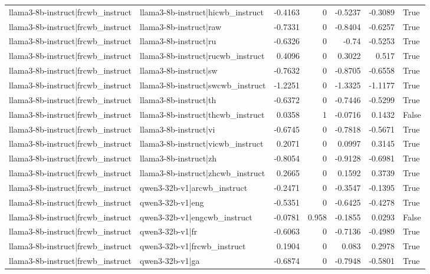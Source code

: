 \begin{table}
\begin{tabular}{l l r r r r l}
llama3-8b-instruct|frcwb_instruct & llama3-8b-instruct|hicwb_instruct & -0.4163 & 0 & -0.5237 & -0.3089 & True \\
llama3-8b-instruct|frcwb_instruct & llama3-8b-instruct|raw & -0.7331 & 0 & -0.8404 & -0.6257 & True \\
llama3-8b-instruct|frcwb_instruct & llama3-8b-instruct|ru & -0.6326 & 0 & -0.74 & -0.5253 & True \\
llama3-8b-instruct|frcwb_instruct & llama3-8b-instruct|rucwb_instruct & 0.4096 & 0 & 0.3022 & 0.517 & True \\
llama3-8b-instruct|frcwb_instruct & llama3-8b-instruct|sw & -0.7632 & 0 & -0.8705 & -0.6558 & True \\
llama3-8b-instruct|frcwb_instruct & llama3-8b-instruct|swcwb_instruct & -1.2251 & 0 & -1.3325 & -1.1177 & True \\
llama3-8b-instruct|frcwb_instruct & llama3-8b-instruct|th & -0.6372 & 0 & -0.7446 & -0.5299 & True \\
llama3-8b-instruct|frcwb_instruct & llama3-8b-instruct|thcwb_instruct & 0.0358 & 1 & -0.0716 & 0.1432 & False \\
llama3-8b-instruct|frcwb_instruct & llama3-8b-instruct|vi & -0.6745 & 0 & -0.7818 & -0.5671 & True \\
llama3-8b-instruct|frcwb_instruct & llama3-8b-instruct|vicwb_instruct & 0.2071 & 0 & 0.0997 & 0.3145 & True \\
llama3-8b-instruct|frcwb_instruct & llama3-8b-instruct|zh & -0.8054 & 0 & -0.9128 & -0.6981 & True \\
llama3-8b-instruct|frcwb_instruct & llama3-8b-instruct|zhcwb_instruct & 0.2665 & 0 & 0.1592 & 0.3739 & True \\
llama3-8b-instruct|frcwb_instruct & qwen3-32b-v1|arcwb_instruct & -0.2471 & 0 & -0.3547 & -0.1395 & True \\
llama3-8b-instruct|frcwb_instruct & qwen3-32b-v1|eng & -0.5351 & 0 & -0.6425 & -0.4278 & True \\
llama3-8b-instruct|frcwb_instruct & qwen3-32b-v1|engcwb_instruct & -0.0781 & 0.958 & -0.1855 & 0.0293 & False \\
llama3-8b-instruct|frcwb_instruct & qwen3-32b-v1|fr & -0.6063 & 0 & -0.7136 & -0.4989 & True \\
llama3-8b-instruct|frcwb_instruct & qwen3-32b-v1|frcwb_instruct & 0.1904 & 0 & 0.083 & 0.2978 & True \\
llama3-8b-instruct|frcwb_instruct & qwen3-32b-v1|ga & -0.6874 & 0 & -0.7948 & -0.5801 & True \\

\end{tabular}
\end{table}
